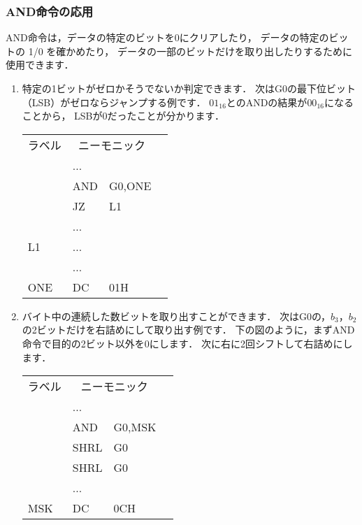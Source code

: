 \subsubsection{AND命令の応用}
AND命令は，データの特定のビットを0にクリアしたり，
データの特定のビットの 1/0 を確かめたり，
データの一部のビットだけを取り出したりするために使用できます．

\begin{enumerate}
\item 特定の1ビットがゼロかそうでないか判定できます．
  次はG0の最下位ビット（LSB）がゼロならジャンプする例です．
  $01_{16}$とのANDの結果が$00_{16}$になることから，
  LSBが$0$だったことが分かります．

  {\small\ttfamily\begin{center}
    \begin{tabular}{|l|l l|l}
      \cline{1-3}
      ラベル & \multicolumn{2}{|c|}{ニーモニック} & \\
      \cline{1-3}
      & ...  &        & \\
      & AND  & G0,ONE & \\
      & JZ   & L1     & \\
      & ...  &        & \\
      L1  & ...  &        & \\
      & ...  &        & \\
      ONE & DC   & 01H    & \\
      \cline{1-3}
    \end{tabular}
  \end{center}}

\item バイト中の連続した数ビットを取り出すことができます．
  次はG0の，$b_3$，$b_2$の2ビットだけを右詰めにして取り出す例です．
  下の図のように，まずAND命令で目的の2ビット以外を0にします．
  次に右に2回シフトして右詰めにします．

  {\small\ttfamily\begin{center}
    \begin{tabular}{|l|l l|l}
      \cline{1-3}
      ラベル & \multicolumn{2}{|c|}{ニーモニック} & \\
      \cline{1-3}
      & ...  &        & \\
      & AND  & G0,MSK & \\
      & SHRL & G0     & \\
      & SHRL & G0     & \\
      & ...  &        & \\
      MSK & DC   & 0CH    & \\
      \cline{1-3}
    \end{tabular}
  \end{center}}


\end{enumerate}
